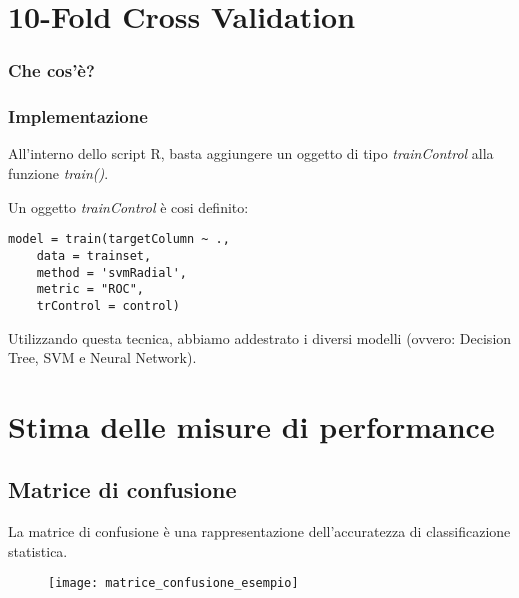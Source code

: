\section{10-Fold Cross Validation}
\label{10fcv}
\subsubsection*{Che cos'è?}


\subsubsection*{Implementazione}

All'interno dello script R, basta aggiungere un oggetto di tipo \textit{trainControl} alla funzione \textit{train()}.

Un oggetto \textit{trainControl} è cosi definito:

\begin{lstlisting}[caption=Training con train control]
model = train(targetColumn ~ ., 
	data = trainset, 
	method = 'svmRadial',
	metric = "ROC", 
	trControl = control)
\end{lstlisting}

Utilizzando questa tecnica, abbiamo addestrato i diversi modelli (ovvero: Decision Tree, SVM e Neural Network).


\section{Stima delle misure di performance}



\subsection{Matrice di confusione}
La matrice di confusione è una rappresentazione dell'accuratezza di classificazione statistica.

\begin{figure}[H]
	\centering
	\texttt{[image: matrice\_confusione\_esempio]}
\end{figure}












